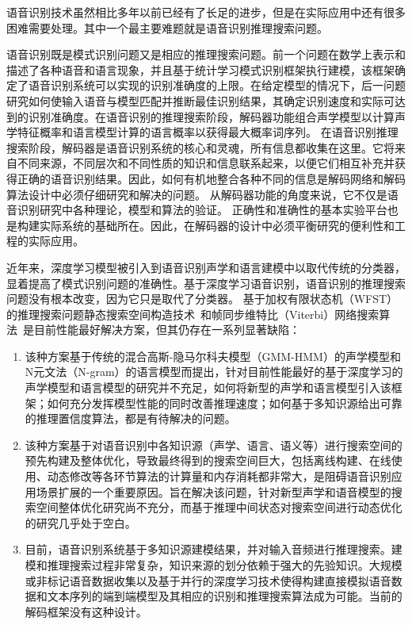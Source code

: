 语音识别技术虽然相比多年以前已经有了长足的进步，但是在实际应用中还有很多困难需要处理。其中一个最主要难题就是语音识别推理搜索问题。

语音识别既是模式识别问题又是相应的推理搜索问题。前一个问题在数学上表示和描述了各种语音和语言现象，并且基于统计学习模式识别框架执行建模，该框架确定了语音识别系统可以实现的识别准确度的上限。在给定模型的情况下，后一问题研究如何使输入语音与模型匹配并推断最佳识别结果，其确定识别速度和实际可达到的识别准确度。在语音识别的推理搜索阶段，解码器功能组合声学模型以计算声学特征概率和语言模型计算的语言概率以获得最大概率词序列。
在语音识别推理搜索阶段，解码器是语音识别系统的核心和灵魂，所有信息都收集在这里。它将来自不同来源，不同层次和不同性质的知识和信息联系起来，以便它们相互补充并获得正确的语音识别结果。因此，如何有机地整合各种不同的信息是解码网络和解码算法设计中必须仔细研究和解决的问题。
从解码器功能的角度来说，它不仅是语音识别研究中各种理论，模型和算法的验证。
正确性和准确性的基本实验平台也是构建实际系统的基础所在。因此，在解码器的设计中必须平衡研究的便利性和工程的实际应用。


近年来，深度学习模型被引入到语音识别声学和语言建模中以取代传统的分类器，显着提高了模式识别问题的准确性。基于深度学习语音识别，语音识别的推理搜索问题没有根本改变，因为它只是取代了分类器。
基于加权有限状态机（WFST）的推理搜索问题静态搜索空间构造技术~\cite{mohri2002weighted}和帧同步维特比（Viterbi）网络搜索算法~\cite{forney1973viterbi}是目前性能最好解决方案，但其仍存在一系列显著缺陷：
\begin{enumerate}
\item 
该种方案基于传统的混合高斯-隐马尔科夫模型（GMM-HMM）的声学模型和N元文法（N-gram）的语言模型而提出，针对目前性能最好的基于深度学习的声学模型和语言模型的研究并不充足，如何将新型的声学和语言模型引入该框架；如何充分发挥模型性能的同时改善推理速度；如何基于多知识源给出可靠的推理置信度算法，都是有待解决的问题。
\item 
该种方案基于对语音识别中各知识源（声学、语言、语义等）进行搜索空间的预先构建及整体优化，导致最终得到的搜索空间巨大，包括离线构建、在线使用、动态修改等各环节算法的计算量和内存消耗都非常大，是阻碍语音识别应用场景扩展的一个重要原因。旨在解决该问题，针对新型声学和语音模型的搜索空间整体优化研究尚不充分，而基于推理中间状态对搜索空间进行动态优化的研究几乎处于空白。
\item 目前，语音识别系统基于多知识源建模结果，并对输入音频进行推理搜索。建模和推理搜索过程非常复杂，知识来源的划分依赖于强大的先验知识。大规模或非标记语音数据收集以及基于并行的深度学习技术使得构建直接模拟语音数据和文本序列的端到端模型及其相应的识别和推理搜索算法成为可能。当前的解码框架没有这种设计。
\end{enumerate}

